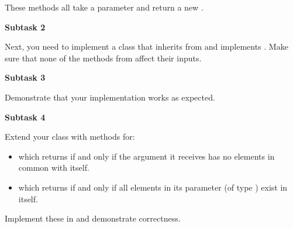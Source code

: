 These methods all take a  parameter and return a new .

\textbf{Subtask 2}

Next, you need to implement a  class that inherits from  and implements . Make sure that none of the methods from  affect their inputs.

\textbf{Subtask 3}

Demonstrate that your implementation works as expected.

\textbf{Subtask 4}

Extend your  class with methods for:
\begin{itemize}
  \item {} which returns  if and only if the  argument it receives has no elements in common with itself.
  \item {} which returns  if and only if all elements in its parameter (of type ) exist in itself.
\end{itemize}

Implement these in  and demonstrate correctness.
